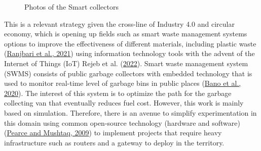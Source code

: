 \documentclass[
  11pt,
]{article}
\begin{document}
\begin{figure}
\begin{minipage}[t]{\linewidth}
{}

\end{minipage}%
\newline
\begin{minipage}[t]{\linewidth}

{\centering 


}

\end{minipage}%

\caption{\label{fig-smart-collector}Photos of the Smart collectors}

\end{figure}

This is a relevant strategy given the cross-line of Industry 4.0 and
circular economy, which is opening up fields such as smart waste
management systems options to improve the effectiveness of different
materials, including plastic waste
(\protect\hyperlink{ref-Ranjbari2021}{Ranjbari et al., 2021}) using
information technology tools with the advent of the Internet of Things
(IoT) Rejeb et al. (\protect\hyperlink{ref-rejeb2022}{2022}). Smart
waste management system (SWMS) consists of public garbage collectors
with embedded technology that is used to monitor real-time level of
garbage bins in public places (\protect\hyperlink{ref-Bano2020}{Bano et
al., 2020}). The interest of this system is to optimize the path for the
garbage collecting van that eventually reduces fuel cost. However, this
work is mainly based on simulation. Therefore, there is an avenue to
simplify experimentation in this domain using common open-source
technology (hardware and software)
(\protect\hyperlink{ref-Pearce2009}{Pearce and Mushtaq, 2009}) to
implement projects that require heavy infrastructure such as routers and
a gateway to deploy in the territory.
\end{document}
